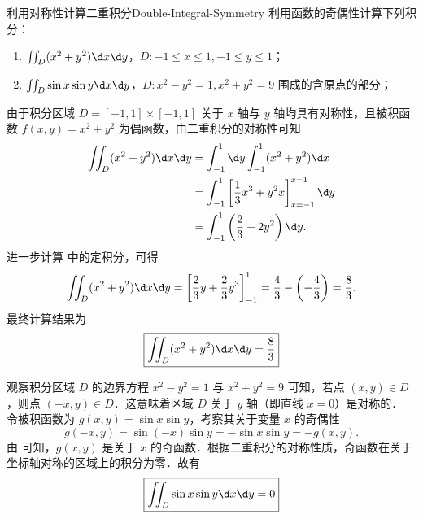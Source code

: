 \begin{problem}{利用对称性计算二重积分}{Double-Integral-Symmetry}
    利用函数的奇偶性计算下列积分：
    \begin{enumerate}
        \item $\iint_{D} (x^{2}+y^{2}) \d x \d y$，$D: -1 \leqslant x \leqslant 1, -1 \leqslant y \leqslant 1$；
        \item $\iint_{D} \sin x \sin y \d x \d y$，$D: x^{2}-y^{2}=1, x^{2}+y^{2}=9$ 围成的含原点的部分；
    \end{enumerate}
\end{problem}

\begin{solution}

    由于积分区域 $D = [-1, 1] \times [-1, 1]$ 关于 $x$ 轴与 $y$ 轴均具有对称性，且被积函数 $f(x, y) = x^2 + y^2$ 为偶函数，由二重积分的对称性可知
    \begin{equation}\label{eq:calc-1}
        \begin{aligned}
            \iint_{D} (x^2 + y^2) \d x \d y & = \int_{-1}^1 \d y \int_{-1}^1 (x^2 + y^2) \d x                       \\
                                            & = \int_{-1}^1 \left[ \frac{1}{3}x^3 + y^2 x \right]_{x=-1}^{x=1} \d y \\
                                            & = \int_{-1}^1 \left( \frac{2}{3} + 2y^2 \right) \d y.
        \end{aligned}
    \end{equation}
    进一步计算  中的定积分，可得
    \begin{equation}
        \iint_{D} (x^2 + y^2) \d x \d y = \left[ \frac{2}{3}y + \frac{2}{3}y^3 \right]_{-1}^1 = \frac{4}{3} - \left( -\frac{4}{3} \right) = \frac{8}{3}.
    \end{equation}
    最终计算结果为
    \begin{equation}
        \boxed{\iint_{D} (x^2 + y^2) \d x \d y = \frac{8}{3}}
    \end{equation}


    观察积分区域 $D$ 的边界方程 $x^2 - y^2 = 1$ 与 $x^2 + y^2 = 9$ 可知，若点 $(x, y) \in D$，则点 $(-x, y) \in D$．这意味着区域 $D$ 关于 $y$ 轴（即直线 $x=0$）是对称的．
    令被积函数为 $g(x, y) = \sin x \sin y$，考察其关于变量 $x$ 的奇偶性
    \begin{equation}\label{eq:parity-check}
        g(-x, y) = \sin(-x) \sin y = -\sin x \sin y = -g(x, y).
    \end{equation}
    由  可知，$g(x, y)$ 是关于 $x$ 的奇函数．根据二重积分的对称性质，奇函数在关于坐标轴对称的区域上的积分为零．故有
    \begin{equation}
        \boxed{\iint_{D} \sin x \sin y \d x \d y = 0}
    \end{equation}
\end{solution}


